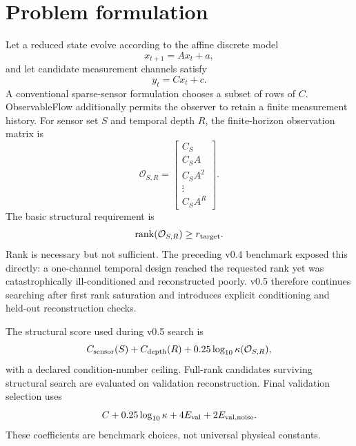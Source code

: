 \documentclass[11pt]{article}
\begin{document}
\section{Problem formulation}
Let a reduced state evolve according to the affine discrete model
\begin{equation}
 x_{t+1}=Ax_t+a,
\end{equation}
and let candidate measurement channels satisfy
\begin{equation}
 y_t=Cx_t+c.
\end{equation}
A conventional sparse-sensor formulation chooses a subset of rows of $C$. ObservableFlow additionally permits the observer to retain a finite measurement history. For sensor set $S$ and temporal depth $R$, the finite-horizon observation matrix is
\begin{equation}
\mathcal O_{S,R}=
\begin{bmatrix}
C_S\\
C_SA\\
C_SA^2\\
\vdots\\
C_SA^R
\end{bmatrix}.
\end{equation}
The basic structural requirement is
\begin{equation}
\operatorname{rank}(\mathcal O_{S,R})\ge r_{\rm target}.
\end{equation}
Rank is necessary but not sufficient. The preceding v0.4 benchmark exposed this directly: a one-channel temporal design reached the requested rank yet was catastrophically ill-conditioned and reconstructed poorly. v0.5 therefore continues searching after first rank saturation and introduces explicit conditioning and held-out reconstruction checks.

The structural score used during v0.5 search is
\begin{equation}
C_{\rm sensor}(S)+C_{\rm depth}(R)+0.25\log_{10}\kappa(\mathcal O_{S,R}),
\end{equation}
with a declared condition-number ceiling. Full-rank candidates surviving structural search are evaluated on validation reconstruction. Final validation selection uses
\begin{equation}
C+0.25\log_{10}\kappa+4E_{\rm val}+2E_{\rm val,noise}.
\end{equation}
These coefficients are benchmark choices, not universal physical constants.
\end{document}
